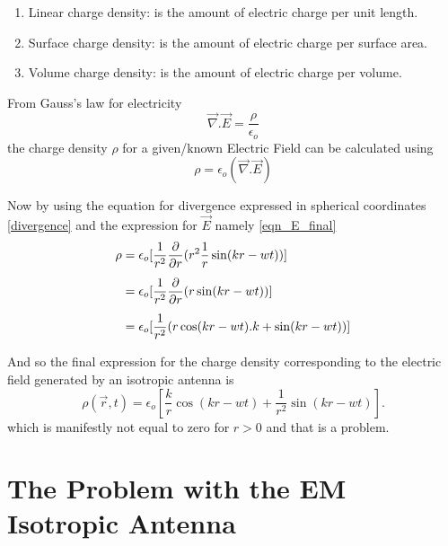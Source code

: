 \begin{enumerate}
   \item Linear charge density: is the amount of electric charge per unit length.
   \item Surface charge density: is the amount of electric charge per surface area.
   \item Volume charge density: is the amount of electric charge per volume.
\end{enumerate}

From Gauss's law for electricity
\begin{equation}
\vec{\nabla}.\vec{E} = \frac{\rho}{\epsilon_{o}}
\end{equation}
the charge density $\rho$ for a given/known Electric Field can be calculated using
\begin{equation}
\rho = {\epsilon_{o}}(\vec{\nabla}.\vec{E})
\end{equation}

Now by using the equation for divergence expressed in spherical coordinates \eqref{divergence} and the expression for $\vec{E}$ namely \eqref{eqn_E_final}
\begin{equation}
   \begin{aligned}
      \rho &= {\epsilon_{o}}[\frac{1}{r^2}\frac{\partial}{\partial r}(r^2\frac{1}{r}\sin(kr-wt))]\\[0.3\baselineskip]
           &= {\epsilon_{o}}[\frac{1}{r^2}\frac{\partial}{\partial r}(r\sin(kr-wt))]\\[0.3\baselineskip]
           &= {\epsilon_{o}}[\frac{1}{r^2}(r\cos(kr-wt).k+\sin(kr-wt))]
   \end{aligned}
\end{equation}

And so the final expression for the charge density corresponding to the electric field generated by an isotropic antenna is
\begin{equation}\label{eqn:rho_final}
   \rho(\vec{r}, t) = {\epsilon_{o}}[\frac{k}{r}\cos(kr-wt)+\frac{1}{r^2}\sin(kr-wt)].
\end{equation}
%
which is manifestly not equal to zero for $r > 0$ and that is a problem.


\section{The Problem with the EM Isotropic Antenna}

